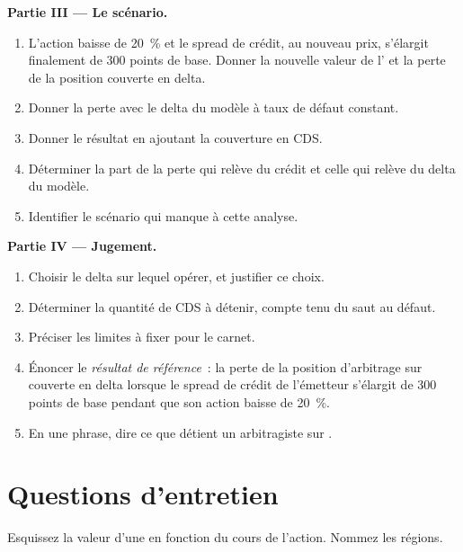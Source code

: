 \begin{problem}
\medskip\noindent\textbf{Partie III --- Le scénario.}
\begin{enumerate}[resume]
\item L'action baisse de 20~\% et le spread de crédit, au nouveau prix, s'élargit finalement de 300 points de base. Donner la nouvelle valeur de l' et la perte de la position couverte en delta.
\item Donner la perte avec le delta du modèle à taux de défaut constant.
\item Donner le résultat en ajoutant la couverture en CDS.
\item Déterminer la part de la perte qui relève du crédit et celle qui relève du delta du modèle.
\item Identifier le scénario qui manque à cette analyse.
\end{enumerate}

\medskip\noindent\textbf{Partie IV --- Jugement.}
\begin{enumerate}[resume]
\item Choisir le delta sur lequel opérer, et justifier ce choix.
\item Déterminer la quantité de CDS à détenir, compte tenu du saut au défaut.
\item Préciser les limites à fixer pour le carnet.
\item Énoncer le \emph{résultat de référence}~: la perte de la position d'arbitrage sur  couverte en delta lorsque le spread de crédit de l'émetteur s'élargit de 300 points
de base pendant que son action baisse de 20~\%.
\item En une phrase, dire ce que détient un arbitragiste sur .
\end{enumerate}
\end{problem}

\section{Questions d'entretien}

\begin{interviewq}\label{iq:dv:convertibles-and-the-credit-equity-link:1}
Esquissez la valeur d'une  en fonction du cours de l'action. Nommez les régions.
\end{interviewq}

